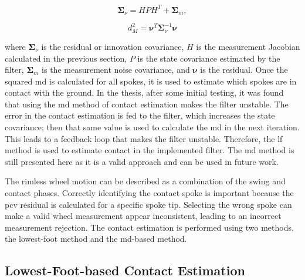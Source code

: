 \documentclass[report.tex]{subfiles}
\begin{document}
        \begin{equation}
        \boldsymbol{\Sigma}_{\nu}
        =
        H P H^{T}
        +
        \boldsymbol{\Sigma}_{m}, 
        \label{eq:innovationCovariance}
        \end{equation}
        
        \begin{equation}
        d_M^2
        =
        \boldsymbol{\nu}^{T}
        \boldsymbol{\Sigma}_{\nu}^{-1}
        \boldsymbol{\nu}
        \label{eq:mahalanobisDistanceSquared}
        \end{equation}
        
        where $\boldsymbol{\Sigma}_{\nu}$ is the residual or innovation covariance, $H$ is the measurement Jacobian calculated in the previous section, $P$ is the state covariance estimated by the filter, $\boldsymbol{\Sigma}_{m}$ is the measurement noise covariance, and $\boldsymbol{\nu}$ is the residual.
        Once the squared \gls{md} is calculated for all spokes, it is used to estimate which spokes are in contact with the ground. In the thesis, after some initial testing, it was found that using the \gls{md} method of contact estimation makes the filter unstable. The error in the contact estimation is fed to the filter, which increases the state covariance; then that same value is used to calculate the \gls{md} in the next iteration. This leads to a feedback loop that makes the filter unstable. Therefore, the \gls{lf} method is used to estimate contact in the implemented filter. The \gls{md} method is still presented here as it is a valid approach and can be used in future work.        
        
        The rimless wheel motion can be described as a combination of the swing and contact phases. Correctly identifying the contact spoke is important because the \gls{pcv} residual is calculated for a specific spoke tip. Selecting the wrong spoke can make a valid wheel measurement appear inconsistent, leading to an incorrect measurement rejection. The contact estimation is performed using two methods, the lowest-foot method and the \gls{md}-based method. 
        
        \subsection{Lowest-Foot-based Contact Estimation}
        
\end{document}
